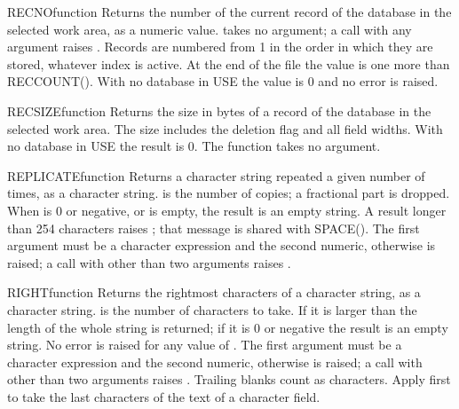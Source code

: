 \begin{XbaseEntry}{RECNO}{function}
Returns the number of the current record of the database in the selected work area, as a numeric value.
\Syntax
{}
\Usage
{} takes no argument; a call with any argument raises . Records are numbered from 1 in the order in which they are stored, whatever index is active. At the end of the file the value is one more than RECCOUNT(). With no database in USE the value is 0 and no error is raised.
\Examples
{}
\end{XbaseEntry}

\begin{XbaseEntry}{RECSIZE}{function}
Returns the size in bytes of a record of the database in the selected work area.
\Syntax
{}
\Usage
The size includes the deletion flag and all field widths.  With no database
in USE the result is 0.  The function takes no argument.
\Examples
{}
\end{XbaseEntry}

\begin{XbaseEntry}{REPLICATE}{function}
Returns a character string repeated a given number of times, as a character string.
\Syntax
{}
\Usage
{} is the number of copies; a fractional part is dropped. When  is 0 or negative, or  is empty, the result is an empty string. A result longer than 254 characters raises ; that message is shared with SPACE(). The first argument must be a character expression and the second numeric, otherwise  is raised; a call with other than two arguments raises .
\Examples
{}
\end{XbaseEntry}

\begin{XbaseEntry}{RIGHT}{function}
Returns the rightmost characters of a character string, as a character string.
\Syntax
{}
\Usage
{} is the number of characters to take. If it is larger than the length of  the whole string is returned; if it is 0 or negative the result is an empty string. No error is raised for any value of . The first argument must be a character expression and the second numeric, otherwise  is raised; a call with other than two arguments raises .
\Tips
Trailing blanks count as characters. Apply  first to take the last characters of the text of a character field.
\Examples
{}
\end{XbaseEntry}

